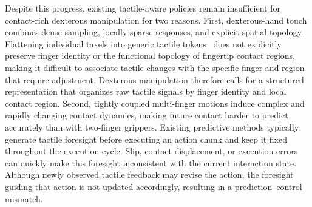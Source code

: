 Despite this progress, existing tactile-aware policies remain insufficient for contact-rich dexterous manipulation for two reasons. 
First, dexterous-hand touch combines dense sampling, locally sparse responses, and explicit spatial topology. 
Flattening individual taxels into generic tactile tokens~\cite{huang2025tactile} does not explicitly preserve finger identity or the functional topology of fingertip contact regions, making it difficult to associate tactile changes with the specific finger and region that require adjustment. 
Dexterous manipulation therefore calls for a structured representation that organizes raw tactile signals by finger identity and local contact region.
Second, tightly coupled multi-finger motions induce complex and rapidly changing contact dynamics, making future contact harder to predict accurately than with two-finger grippers. 
Existing predictive methods typically generate tactile foresight before executing an action chunk and keep it fixed throughout the execution cycle. 
Slip, contact displacement, or execution errors can quickly make this foresight inconsistent with the current interaction state. 
Although newly observed tactile feedback may revise the action, the foresight guiding that action is not updated accordingly, resulting in a prediction--control mismatch.



